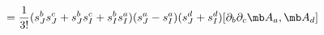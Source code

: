 \begin{equation}
[L_2^{(3)},L_1^{(1)}-L_3^{(1)}]= \frac{1}{3!}( s_{J}^{b}s_{J}^{c}+s_{J}^{b}s_{I}^{c}+ s_{I}^{b} s_{I}^{a})   ( s_{J}^{a}- s_{I}^{a})( s_{J}^{d}+ s_{I}^{d})  [ \partial_b\partial_c{\mb A}_a,{\mb A}_d]
\end{equation}

